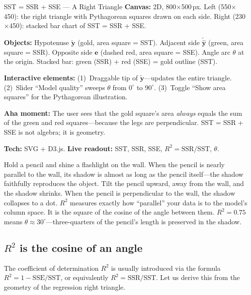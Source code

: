 \documentclass[11pt,a4paper]{article}
\theoremstyle{plain}
\theoremstyle{definition}
\newcommand{\yhat}{\hat{\bm{y}}}
\newcommand{\by}{\bm{y}}
\newcommand{\be}{\bm{e}}
\begin{document}
\begin{vizspec}{SST = SSR + SSE --- A Right Triangle}
\textbf{Canvas:} 2D, 800$\times$500\,px.
Left (550$\times$450): the right triangle with Pythagorean squares drawn
on each side.  Right (230$\times$450): stacked bar chart of
SST = SSR + SSE.

\textbf{Objects:} Hypotenuse $\tilde{\by}$ (\textcolor{response}{gold},
area square = SST).  Adjacent side $\tilde{\yhat}$
(\textcolor{projection}{green}, area square = SSR).  Opposite side $\be$
(dashed \textcolor{residual}{red}, area square = SSE).  Angle arc
$\theta$ at the origin.  Stacked bar: green (SSR) + red (SSE) = gold
outline (SST).

\textbf{Interactive elements:}
(1)~Draggable tip of $\tilde{\by}$---updates the entire triangle.
(2)~Slider ``Model quality'' sweeps $\theta$ from $0^\circ$ to $90^\circ$.
(3)~Toggle ``Show area squares'' for the Pythagorean illustration.

\textbf{Aha moment:} The user sees that the gold square's area
\emph{always} equals the sum of the green and red squares---because the
legs are perpendicular.  SST = SSR + SSE is not algebra; it is geometry.

\textbf{Tech:} SVG + D3.js.
\quad \textbf{Live readout:} SST, SSR, SSE, $R^2 = \text{SSR}/\text{SST}$, $\theta$.
\end{vizspec}

\begin{toystory}
Hold a pencil and shine a flashlight on the wall.  When the pencil is
nearly parallel to the wall, its shadow is almost as long as the pencil
itself---the shadow faithfully reproduces the object.  Tilt the pencil
upward, away from the wall, and the shadow shrinks.  When the pencil is
perpendicular to the wall, the shadow collapses to a dot.
$R^2$ measures exactly how ``parallel'' your data is to the model's
column space.  It is the square of the cosine of the angle between them.
$R^2 = 0.75$ means $\theta \approx 30^\circ$---three-quarters of the
pencil's length is preserved in the shadow.
\end{toystory}

\subsection{$R^2$ is the cosine of an angle}\label{sec:r2}

The coefficient of determination $R^2$ is usually introduced via the formula
$R^2 = 1 - \text{SSE}/\text{SST}$, or equivalently
$R^2 = \text{SSR}/\text{SST}$.
Let us derive this from the geometry of the regression right triangle.
\end{document}

